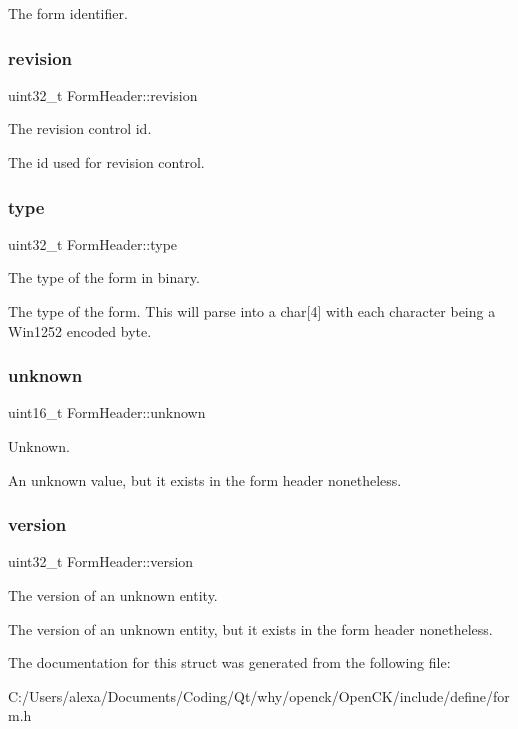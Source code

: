 The form identifier. \mbox{\label{struct_form_header_a32a8415135b878ae97078d696cf54e1e}} 
\subsubsection{\texorpdfstring{revision}{revision}}
{\footnotesize\ttfamily uint32\+\_\+t Form\+Header\+::revision}



The revision control id. 

The id used for revision control. \mbox{\label{struct_form_header_a7c328abb1290000cef194ba4b71289db}} 
\subsubsection{\texorpdfstring{type}{type}}
{\footnotesize\ttfamily uint32\+\_\+t Form\+Header\+::type}



The type of the form in binary. 

The type of the form. This will parse into a char\mbox{[}4\mbox{]} with each character being a Win1252 encoded byte. \mbox{\label{struct_form_header_aec53fee93e6738cbb7d95e74043337ac}} 
\subsubsection{\texorpdfstring{unknown}{unknown}}
{\footnotesize\ttfamily uint16\+\_\+t Form\+Header\+::unknown}



Unknown. 

An unknown value, but it exists in the form header nonetheless. \mbox{\label{struct_form_header_a44d62c93920ca145bdfa363ee71b18aa}} 
\subsubsection{\texorpdfstring{version}{version}}
{\footnotesize\ttfamily uint32\+\_\+t Form\+Header\+::version}



The version of an unknown entity. 

The version of an unknown entity, but it exists in the form header nonetheless. 

The documentation for this struct was generated from the following file\+:\begin{DoxyCompactItemize}
\item 
C\+:/\+Users/alexa/\+Documents/\+Coding/\+Qt/why/openck/\+Open\+C\+K/include/define/form.\+h\end{DoxyCompactItemize}
